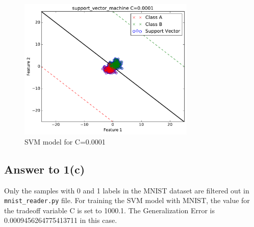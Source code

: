 \documentclass[runningheads]{llncs}
\begin{document}
\begin{figure}
\centering
\includegraphics[width=0.75\textwidth]{support_vector_machine0_0001.pdf}
\caption{SVM model for C=0.0001} \label{fig:svm_c_0.0001}
\end{figure}

\subsection{Answer to 1(c)}
Only the samples with 0 and 1 labels in the MNIST dataset are filtered out in \texttt{mnist\_reader.py} file.
For training the SVM model with MNIST, the value for the tradeoff variable C is set to 1000.1.
The Generalization Error is 0.0009456264775413711 in this case.
\end{document}
